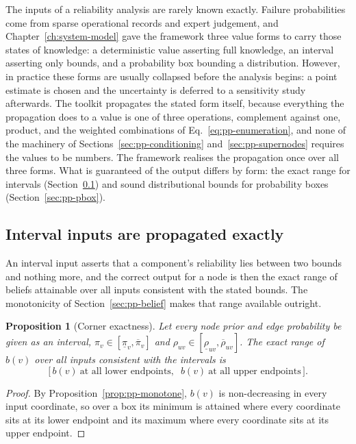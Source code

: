 \documentclass[12pt]{report}
\newtheorem{proposition}[theorem]{Proposition}
\begin{document}
The inputs of a reliability analysis are rarely known exactly. Failure probabilities come from sparse operational records and expert judgement, and Chapter~\ref{ch:system-model} gave the framework three value forms to carry those states of knowledge: a deterministic value asserting full knowledge, an interval asserting only bounds, and a probability box bounding a distribution. However, in practice these forms are usually collapsed before the analysis begins: a point estimate is chosen and the uncertainty is deferred to a sensitivity study afterwards. The toolkit propagates the stated form itself, because everything the propagation does to a value is one of three operations, complement against one, product, and the weighted combinations of Eq.~\eqref{eq:pp-enumeration}, and none of the machinery of Sections~\ref{sec:pp-conditioning} and~\ref{sec:pp-supernodes} requires the values to be numbers. The framework realises the propagation once over all three forms. What is guaranteed of the output differs by form: the exact range for intervals (Section~\ref{sec:pp-interval}) and sound distributional bounds for probability boxes (Section~\ref{sec:pp-pbox}).

\subsection{Interval inputs are propagated exactly}
\label{sec:pp-interval}

An interval input asserts that a component's reliability lies between two bounds and nothing more, and the correct output for a node is then the exact range of beliefs attainable over all inputs consistent with the stated bounds. The monotonicity of Section~\ref{sec:pp-belief} makes that range available outright.

\begin{proposition}[Corner exactness]
\label{prop:pp-corners}
Let every node prior and edge probability be given as an interval, $\pi_v \in [\underline{\pi}_v, \overline{\pi}_v]$ and $\rho_{uv} \in [\underline{\rho}_{uv}, \overline{\rho}_{uv}]$. The exact range of $b(v)$ over all inputs consistent with the intervals is
\[
\bigl[\, b(v)\ \text{at all lower endpoints},\;\; b(v)\ \text{at all upper endpoints} \,\bigr].
\]
\end{proposition}

\begin{proof}
By Proposition~\ref{prop:pp-monotone}, $b(v)$ is non-decreasing in every input coordinate, so over a box its minimum is attained where every coordinate sits at its lower endpoint and its maximum where every coordinate sits at its upper endpoint.
\end{proof}
\end{document}
